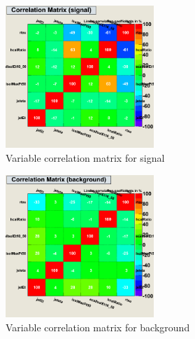 \begin{figure}[h]
\begin{center}
\includegraphics[width=0.5\textwidth]{images/ahCorrelationMatrixS.png}
\caption{Variable correlation matrix for signal}
\label{fig:ahCorrelationMatrixS}
\end{center}
\end{figure}

\begin{figure}[h]
\begin{center}
\includegraphics[width=0.5\textwidth]{images/ahCorrelationMatrixB.png}
\caption{Variable correlation matrix for background}
\label{fig:ahCorrelationMatrixB}
\end{center}
\end{figure}

